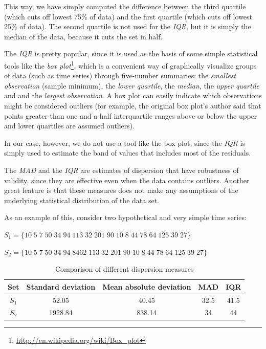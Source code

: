 \documentclass[12pt,a4paper,cucitura]{toptesi}
\begin{document}
This way, we have simply computed the difference between the third quartile (which cuts off lowest 75\% of data) and the first quartile (which cuts off lowest 25\% of data). The second quartile is not used for the \emph{IQR}, but it is simply the median of the data, because it cuts the set in half.

The \emph{IQR} is pretty popular, since it is used as the basis of some simple statistical tools like the \emph{box plot}\footnote{\url{http://en.wikipedia.org/wiki/Box_plot}}, which is a convenient way of graphically visualize groups of data (such as time series) through five-number summaries: the \emph{smallest observation} (sample minimum), the \emph{lower quartile}, the \emph{median}, the \emph{upper quartile} and and the \emph{largest observation}. A box plot can easily indicate which observations might be considered outliers (for example, the original box plot's author said that points greater than one and a half interquartile ranges above or below the upper and lower quartiles are assumed outliers). 


In our case, however, we do not use a tool like the box plot, since the \emph{IQR} is simply used to estimate the band of values that includes most of the residuals.


The \emph{MAD} and the \emph{IQR} are estimates of dispersion that have robustness of validity, since they are effective even when the data contains outliers. Another great feature is that these measures does not make any assumptions of the underlying statistical distribution of the data set.

As an example of this, consider two hypothetical and very simple time series:

\begin{center}
$S_1 = \{10\;5\;7\;50\;34\;94\;113\;32\;201\;90\;10\;8\;44\;78\;64\;125\;39\;27\}$
\end{center}

\begin{center}
$S_2 = \{10\;5\;7\;50\;34\;94\;8462\;113\;32\;201\;90\;10\;8\;44\;78\;64\;125\;39\;27\}$
\end{center}

\begin{table}
\centering
\begin{tabular}{|c|c|c|c|c|}
\hline
\hline
Set & Standard deviation & Mean absolute deviation & MAD & IQR \\
\hline
$S_1$ & 52.05 & 40.45 & 32.5 & 41.5 \\
$S_2$ & 1928.84 & 838.14 & 34 & 44 \\
\hline
\hline
\end{tabular}
\caption{Comparison of different dispersion measures}
\end{table}
\end{document}
